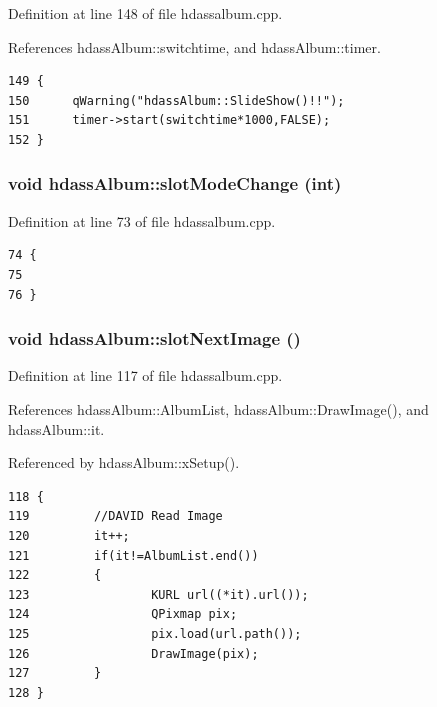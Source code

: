 Definition at line 148 of file hdassalbum.cpp.

References hdass\-Album::switchtime, and hdass\-Album::timer.



\footnotesize\begin{verbatim}149 {
150      qWarning("hdassAlbum::SlideShow()!!");
151      timer->start(switchtime*1000,FALSE);
152 }
\end{verbatim}\normalsize 
{}
\subsubsection{\setlength{\rightskip}{0pt plus 5cm}void hdass\-Album::slot\-Mode\-Change (int)\hspace{0.3cm}{\tt  [slot, inherited]}}\label{classhdassAlbum_ImageDetiali7}




Definition at line 73 of file hdassalbum.cpp.



\footnotesize\begin{verbatim}74 {
75 
76 }
\end{verbatim}\normalsize 
{}
\subsubsection{\setlength{\rightskip}{0pt plus 5cm}void hdass\-Album::slot\-Next\-Image ()\hspace{0.3cm}{\tt  [slot, inherited]}}\label{classhdassAlbum_ImageDetiali4}




Definition at line 117 of file hdassalbum.cpp.

References hdass\-Album::Album\-List, hdass\-Album::Draw\-Image(), and hdass\-Album::it.

Referenced by hdass\-Album::x\-Setup().



\footnotesize\begin{verbatim}118 {
119         //DAVID Read Image
120         it++;
121         if(it!=AlbumList.end())
122         {
123                 KURL url((*it).url());
124                 QPixmap pix;
125                 pix.load(url.path());
126                 DrawImage(pix);
127         }
128 }
\end{verbatim}\normalsize 
{}
